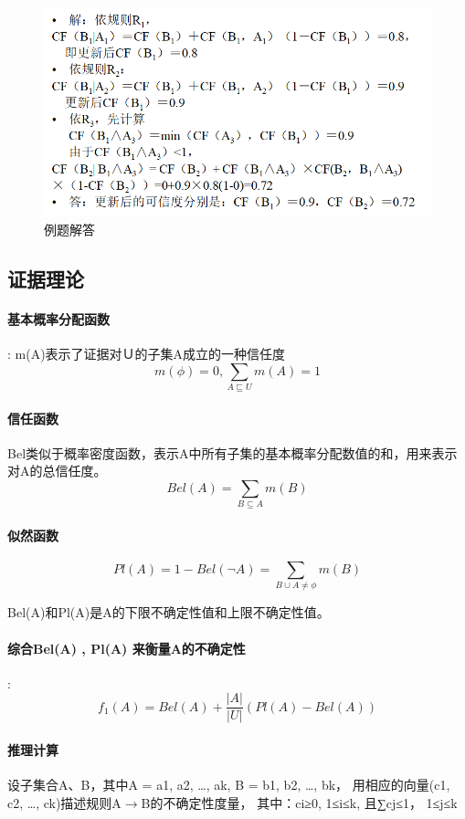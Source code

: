 \documentclass[UTF8,a4paper]{ctexart}
\begin{document}
\begin{figure}[H]
	\centering
	\includegraphics[scale = 0.5]{assets/ArtificialIntelligence/2018-01-09-00-29-43.png}
	\caption{例题解答}
\end{figure}


\subsection{证据理论}

\paragraph{基本概率分配函数}: m(A)表示了证据对Ｕ的子集A成立的一种信任度
\[m(\phi) = 0 , \sum_{A \sqsubseteq U}m(A) = 1\]

\paragraph{信任函数} Bel类似于概率密度函数，表示A中所有子集的基本概率分配数值的和，用来表示对A的总信任度。
\[Bel(A) = \sum_{B \subseteq A} m(B)\]

\paragraph{似然函数}
\[Pl(A) = 1 - Bel(\lnot A) = \sum_{B \cup A \neq \phi} m(B)\]

Bel(A)和Pl(A)是A的下限不确定性值和上限不确定性值。

\paragraph{综合Bel(A) , Pl(A) 来衡量A的不确定性}:
\[f_1(A) = Bel(A) + \frac{|A|}{|U|}(Pl(A) - Bel(A))\]

\paragraph{推理计算}设子集合A、B，其中A = {a1, a2, …, ak},
B = {b1, b2, …, bk}，
用相应的向量(c1, c2, …, ck)描述规则A$\to$B的不确定性度量，
其中：ci≥0, 1≤i≤k, 且∑cj≤1， 1≤j≤k
\end{document}
